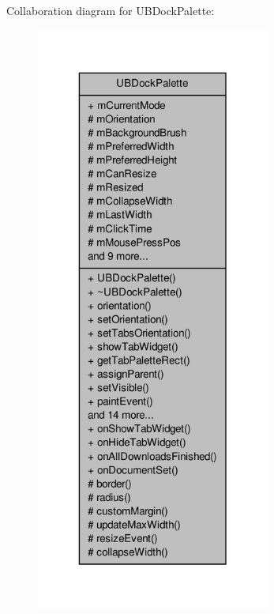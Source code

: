 Collaboration diagram for U\-B\-Dock\-Palette\-:
\nopagebreak
\begin{figure}[H]
\begin{center}
\leavevmode
\includegraphics[width=218pt]{d2/d80/class_u_b_dock_palette__coll__graph}
\end{center}
\end{figure}
